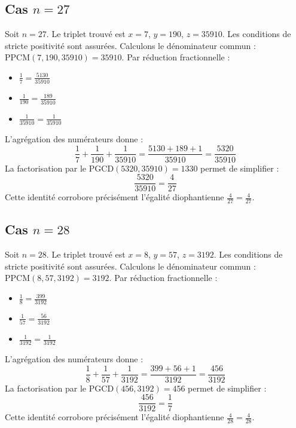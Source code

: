 \documentclass[11pt,a4paper]{article}
\begin{document}
\subsection{Cas $n = 27$}
Soit $n = 27$. Le triplet trouvé est $x = 7$, $y = 190$, $z = 35910$.
Les conditions de stricte positivité sont assurées.
Calculons le dénominateur commun : $\text{PPCM}(7, 190, 35910) = 35910$.
Par réduction fractionnelle :
\begin{itemize}
    \item $\frac{1}{7} = \frac{5130}{35910}$
    \item $\frac{1}{190} = \frac{189}{35910}$
    \item $\frac{1}{35910} = \frac{1}{35910}$
\end{itemize}
L'agrégation des numérateurs donne :
$$ \frac{1}{7} + \frac{1}{190} + \frac{1}{35910} = \frac{5130 + 189 + 1}{35910} = \frac{5320}{35910} $$
La factorisation par le $\text{PGCD}(5320, 35910) = 1330$ permet de simplifier :
$$ \frac{5320}{35910} = \frac{4}{27} $$
Cette identité corrobore précisément l'égalité diophantienne $\frac{4}{27} = \frac{4}{27}$.

\subsection{Cas $n = 28$}
Soit $n = 28$. Le triplet trouvé est $x = 8$, $y = 57$, $z = 3192$.
Les conditions de stricte positivité sont assurées.
Calculons le dénominateur commun : $\text{PPCM}(8, 57, 3192) = 3192$.
Par réduction fractionnelle :
\begin{itemize}
    \item $\frac{1}{8} = \frac{399}{3192}$
    \item $\frac{1}{57} = \frac{56}{3192}$
    \item $\frac{1}{3192} = \frac{1}{3192}$
\end{itemize}
L'agrégation des numérateurs donne :
$$ \frac{1}{8} + \frac{1}{57} + \frac{1}{3192} = \frac{399 + 56 + 1}{3192} = \frac{456}{3192} $$
La factorisation par le $\text{PGCD}(456, 3192) = 456$ permet de simplifier :
$$ \frac{456}{3192} = \frac{1}{7} $$
Cette identité corrobore précisément l'égalité diophantienne $\frac{4}{28} = \frac{4}{28}$.
\end{document}
